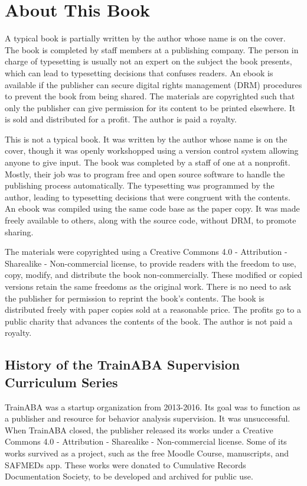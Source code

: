 \documentclass[float=false, crop=false]{standalone}
\begin{document}
\chapter{About This Book}

A typical book is partially written by the author whose name is on the cover. The book is completed by staff members at a publishing company. The person in charge of typesetting is usually not an expert on the subject the book presents, which can lead to typesetting decisions that confuses readers. An ebook is available if the publisher can secure digital rights management (DRM) procedures to prevent the book from being shared. The materials are copyrighted such that only the publisher can give permission for its content to be printed elsewhere. It is sold and distributed for a profit. The author is paid a royalty.

This is not a typical book. It was written by the author whose name is on the cover, though it was openly workshopped using a version control system allowing anyone to give input. The book was completed by a staff of one at a nonprofit. Mostly, their job was to program free and open source software to handle the publishing process automatically. The typesetting was programmed by the author, leading to typesetting decisions that were congruent with the contents. An ebook was compiled using the same code base as the paper copy. It was made freely available to others, along with the source code, without DRM, to promote sharing.

The materials were copyrighted using a Creative Commons 4.0 - Attribution - Sharealike - Non-commercial license, to provide readers with the freedom to use, copy, modify, and distribute the book non-commercially. These modified or copied versions retain the same freedoms as the original work. There is no need to ask the publisher for permission to reprint the book's contents. The book is distributed freely with paper copies sold at a reasonable price. The profits go to a public charity that advances the contents of the book. The author is not paid a royalty.

\section{History of the TrainABA Supervision Curriculum Series}
TrainABA was a startup organization from 2013-2016. Its goal was to function as a publisher and resource for behavior analysis supervision. It was unsuccessful. When TrainABA closed, the publisher released its works under a Creative Commons 4.0 - Attribution - Sharealike - Non-commercial license. Some of its works survived as a project, such as the free Moodle Course, manuscripts, and SAFMEDs app. These works were donated to Cumulative Records Documentation Society, to be developed and archived for public use. 
\end{document}
